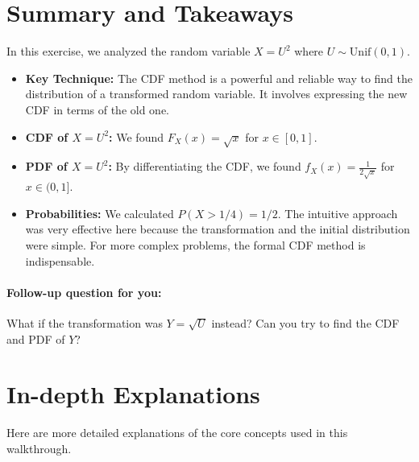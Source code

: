 \documentclass[11pt,a4paper]{article}
\begin{document}
\section{Summary and Takeaways}
In this exercise, we analyzed the random variable $X = U^2$ where $U \sim \text{Unif}(0,1)$.
\begin{itemize}
    \item \textbf{Key Technique:} The CDF method is a powerful and reliable way to find the distribution of a transformed random variable. It involves expressing the new CDF in terms of the old one.
    \item \textbf{CDF of $X=U^2$:} We found $F_X(x) = \sqrt{x}$ for $x \in [0, 1]$.
    \item \textbf{PDF of $X=U^2$:} By differentiating the CDF, we found $f_X(x) = \frac{1}{2\sqrt{x}}$ for $x \in (0, 1]$.
    \item \textbf{Probabilities:} We calculated $P(X > 1/4) = 1/2$. The intuitive approach was very effective here because the transformation and the initial distribution were simple. For more complex problems, the formal CDF method is indispensable.
\end{itemize}

\paragraph{Follow-up question for you:} What if the transformation was $Y = \sqrt{U}$ instead? Can you try to find the CDF and PDF of $Y$?

\newpage
\section{In-depth Explanations}
Here are more detailed explanations of the core concepts used in this walkthrough.
\end{document}
